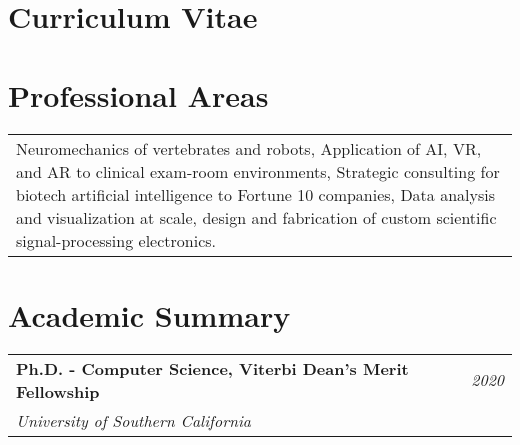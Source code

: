 \documentclass[10pt,a4paper]{article}
\begin{document}
  \newpage


\vspace*{-10mm}\section*{\textbf{Curriculum Vitae}}
\centering{\today}
\vspace*{8mm}\section*{Professional Areas}


  \vspace*{2mm}
  \begin{tabularx}{17cm}{X}
  Neuromechanics of vertebrates and robots, Application of AI, VR, and AR to clinical exam-room environments, Strategic consulting for biotech artificial intelligence to Fortune 10 companies, Data analysis and visualization at scale, design and fabrication of custom scientific signal-processing electronics.
  \end{tabularx}

  \vspace*{5mm}\section*{Academic Summary}

  \vspace*{0mm}\noindent\begin{tabularx}{17cm}{X r}
    \textbf{Ph.D. - Computer Science, Viterbi Dean's Merit Fellowship} & \textit{2020} \\
    \textit{University of Southern California}
  \end{tabularx} 
\end{document}
